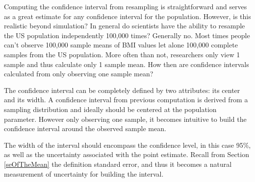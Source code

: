 Computing the confidence interval from resampling is straightforward and serves as a great estimate for any confidence interval for the population. However, is this realistic beyond simulation? In general do scientists have the ability to resample the US population independently 100,000 times? Generally no. Most times people can't observe 100,000 sample means of BMI values let alone 100,000 complete samples from the US population. More often than not, researchers only view 1 sample and thus calculate only 1 sample mean. How then are confidence intervals calculated from only observing one sample mean? 

The confidence interval can be completely defined by two attributes: its center and its width. A confidence interval from previous computation is derived from a sampling distribution and ideally should be centered at the population parameter. However only observing one sample, it becomes intuitive to build the confidence interval around the observed sample mean. 
  
The width of the interval should encompass the confidence level, in this case 95\%, as well as the uncertainty associated with the point estimate. Recall from Section \ref{seOfTheMean} the definition standard error, and thus it becomes a natural measurement of uncertainty for building the interval.  

